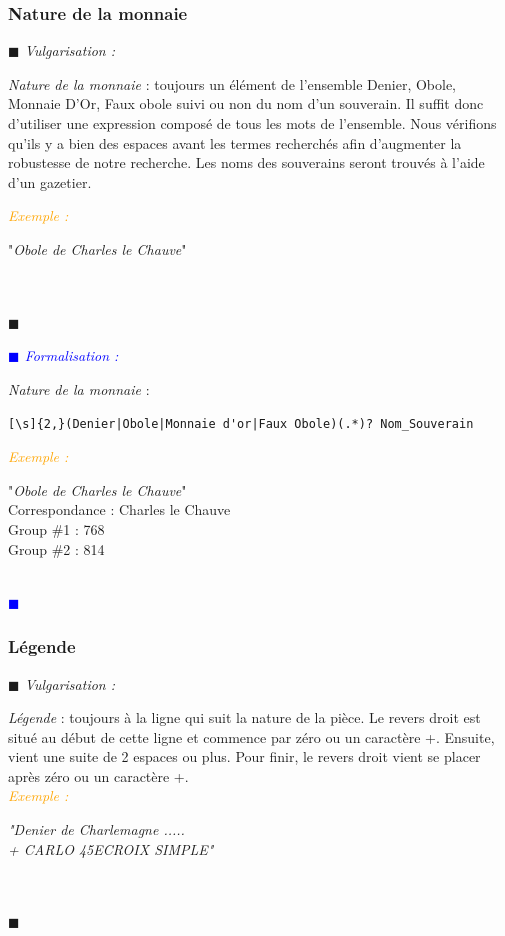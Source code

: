 \documentclass[a4paper, 11pt]{book}
\newenvironment{vulgarisation}
    {
    \textit{\textcolor{dark-blue}{$\blacksquare$  Vulgarisation : \\}}

    }
    {
    ~\\\textcolor{dark-blue}{$\blacksquare$}\\
    }
\newenvironment{formalisation}
    {
    \textit{\textcolor{blue}{$\blacksquare$  Formalisation : \\}}
    }
    {
    ~\\\textcolor{blue}{$\blacksquare$}\\
    }
\newenvironment{exemple}
    {
    \textit{\textcolor{orange}{
    Exemple : \\}}
    }
    {\\
    }
\begin{document}
\subsubsection{Nature de la monnaie}
\begin{vulgarisation}
	\textit{Nature de la monnaie} : toujours un élément de l'ensemble {Denier, Obole, Monnaie D'Or, Faux obole} suivi ou non du nom d'un souverain. Il suffit donc d'utiliser une expression composé de tous les mots de l'ensemble. Nous vérifions qu'ils y a bien des espaces avant les termes recherchés afin d'augmenter la robustesse de notre recherche. Les noms des souverains seront trouvés à l'aide d'un gazetier.
	
	\begin{exemple}
		"\emph{Obole de Charles le Chauve}" \\
	\end{exemple}
\end{vulgarisation}

\begin{formalisation}
	\textit{Nature de la monnaie} :
	\begin{verbatim}
[\s]{2,}(Denier|Obole|Monnaie d'or|Faux Obole)(.*)? Nom_Souverain
	\end{verbatim}
	\begin{exemple}
		"\emph{Obole de Charles le Chauve}" \\
		Correspondance : Charles le Chauve \\
		Group \#1 : 768 \\
		Group \#2 : 814
	\end{exemple}
\end{formalisation}

\subsubsection{Légende}
\begin{vulgarisation}
	\textit{Légende} : toujours à la ligne qui suit la nature de la pièce. Le revers droit est situé au début de cette ligne et commence par zéro ou un caractère +. Ensuite, vient une suite de 2 espaces ou plus. Pour finir, le revers droit vient se placer après zéro ou un caractère +.\\
	\begin{exemple}
		\emph{"Denier de Charlemagne ..... \\+ CARLO  45E\indent\indent CROIX SIMPLE"}\\
	\end{exemple}
\end{vulgarisation}
\end{document}
